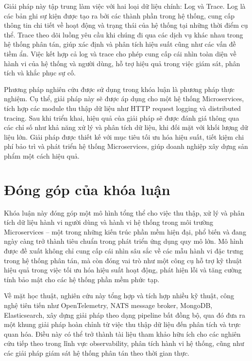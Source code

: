\documentclass{uetgraduation}
\begin{document}
Giải pháp này tập trung làm việc với hai loại dữ liệu chính: Log và Trace. Log là các bản ghi sự kiện được tạo ra bởi các thành phần trong hệ thống, cung cấp thông tin chi tiết về hoạt động và trạng thái của hệ thống tại những thời điểm cụ thể. Trace theo dõi luồng yêu cầu khi chúng đi qua các dịch vụ khác nhau trong hệ thống phân tán, giúp xác định và phân tích hiệu suất cũng như các vấn đề tiềm ẩn. Việc kết hợp cả log và trace cho phép cung cấp cái nhìn toàn diện về hành vi của hệ thống và người dùng, hỗ trợ hiệu quả trong việc giám sát, phân tích và khắc phục sự cố.

Phương pháp nghiên cứu được sử dụng trong khóa luận là phương pháp thực nghiệm. Cụ thể, giải pháp này sẽ được áp dụng cho một hệ thống Microservices, tích hợp các module thu thập dữ liệu như HTTP request logging và distributed tracing. Sau khi triển khai, hiệu quả của giải pháp sẽ được đánh giá thông qua các chỉ số như khả năng xử lý và phân tích dữ liệu, khi đối mặt với khối lượng dữ liệu lớn. Giải pháp được thiết kế với mục tiêu tối ưu hóa hiệu suất, tiết kiệm chi phí bảo trì và phát triển hệ thống Microservices, giúp doanh nghiệp xây dựng sản phẩm một cách hiệu quả.

\section{Đóng góp của khóa luận}
Khóa luận này đóng góp một mô hình tổng thể cho việc thu thập, xử lý và phân tích dữ liệu hành vi người dùng và hành vi hệ thống trong môi trường Microservices – một trong những kiến trúc phần mềm hiện đại, phổ biến và đang ngày càng trở thành tiêu chuẩn trong phát triển ứng dụng quy mô lớn. Mô hình được đề xuất không chỉ cung cấp cái nhìn sâu sắc về các mẫu hành vi đặc trưng trong hệ thống phân tán, mà còn đóng vai trò như một công cụ hỗ trợ kỹ thuật hiệu quả trong việc tối ưu hóa hiệu suất hoạt động, phát hiện lỗi và tăng cường tính bảo mật cho các hệ thống phần mềm phức tạp.

Về mặt học thuật, nghiên cứu này tổng hợp và tích hợp nhiều kỹ thuật, công nghệ tiên tiến như OpenTelemetry, NATS message broker, MongoDB, Elasticsearch, xây dựng giải pháp theo dạng pipeline bất đồng bộ, qua đó đưa ra một khung giải pháp hoàn chỉnh từ việc thu thập dữ liệu đến phân tích và trực quan hóa. Điều này có thể trở thành tài liệu tham khảo hữu ích cho các nghiên cứu tiếp theo trong lĩnh vực observability, phân tích hành vi hệ thống, cũng như các giải pháp giám sát hệ thống phân tán theo thời gian thực.
\end{document}
